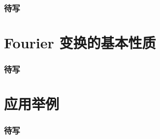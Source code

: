 \begin{frame}
\frametitle{待写}

\end{frame}


\section{Fourier 变换的基本性质}


\begin{frame}
\frametitle{待写}

\end{frame}


\section{应用举例}


\begin{frame}
\frametitle{待写}

\end{frame}



